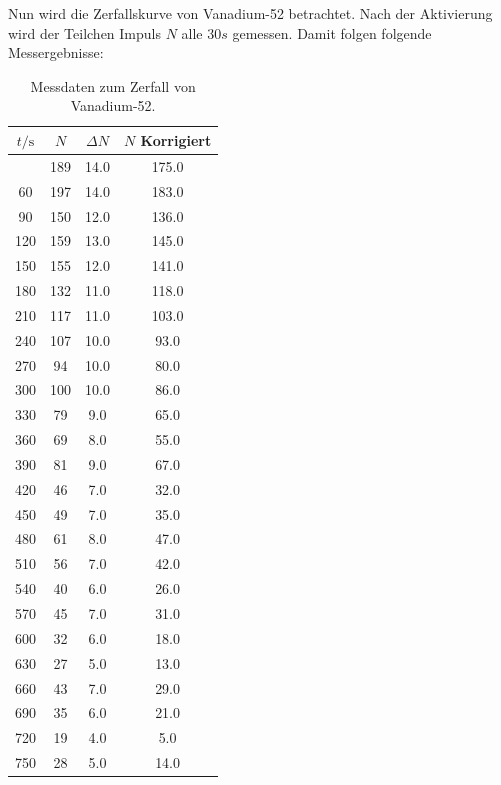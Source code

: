     Nun wird die Zerfallskurve von Vanadium-52 betrachtet. Nach der Aktivierung wird der Teilchen Impuls $N$ alle $30 s$ gemessen. Damit folgen folgende Messergebnisse:
    \begin{longtable}{c c c c}
	\caption{Messdaten zum Zerfall von Vanadium-52.} \label{tab:vana} \\
		\hline
		$t / \si{\second}$ & $N$ & $\Delta N$ &$N$ Korrigiert \\
		\hline
		\endhead
		\hline
		\endfoot
		30   	&      189  	& 14.0 &      175.0 \\
		  60   	&      197  	& 14.0 &      183.0 \\
		  90   	&      150  	& 12.0 &      136.0 \\
		 120   	&      159  	& 13.0 &      145.0 \\
		 150   	&      155  	& 12.0 &      141.0 \\
		 180   	&      132  	& 11.0 &      118.0 \\
		 210   	&      117  	& 11.0 &      103.0 \\
		 240   	&      107  	& 10.0 &       93.0 \\
		 270   	&       94  	& 10.0 &       80.0 \\
		 300   	&      100  	& 10.0 &       86.0 \\
		 330   	&       79  	&  9.0 &       65.0 \\
		 360   	&       69  	&  8.0 &       55.0 \\
		 390   	&       81  	&  9.0 &       67.0 \\
		 420   	&       46  	&  7.0 &       32.0 \\
		 450   	&       49  	&  7.0 &       35.0 \\
		 480   	&       61  	&  8.0 &       47.0 \\
		 510   	&       56  	&  7.0 &       42.0 \\
		 540   	&       40  	&  6.0 &       26.0 \\
		 570   	&       45  	&  7.0 &       31.0 \\
		 600   	&       32  	&  6.0 &       18.0 \\
		 630   	&       27  	&  5.0 &       13.0 \\
		 660   	&       43  	&  7.0 &       29.0 \\
		 690   	&       35  	&  6.0 &       21.0 \\
		 720   	&       19  	&  4.0 &        5.0 \\
		 750   	&       28  	&  5.0 &       14.0 \\

\end{longtable}

